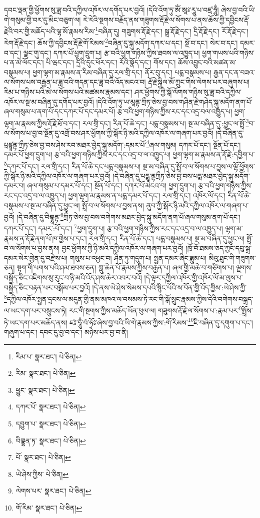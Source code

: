 དབང་ལྡན་གྱི་ཕྱོགས་སུ་ཟླ་བའི་དཀྱིལ་འཁོར་ལ་དགོད་པར་བྱའོ། །དེའི་འོག་ཏུ་ཨོཾ་ཨཱཿ་རཱུ་པ་བཛྲ་ཧཱུྃ། ཞེས་བྱ་བའི་ཡི་གེ་གསུམ་གྱི་བར་དུ་མིང་བཅུག་ལ། རེ་རེའི་སྔགས་བརྗོད་ནས་གཟུགས་རྡོ་རྗེ་ལ་སོགས་པ་ནས་ཆོས་ཀྱི་དབྱིངས་རྡོ་རྗེའི་བར་གྱི་མཆོད་པའི་ལྷ་མོ་རྣམས་རིམ་\footnote{རིམ་པ་  སྣར་ཐང་།  པེ་ཅིན། }བཞིན་དུ། གཟུགས་རྡོ་རྗེ་དང་། སྒྲ་རྡོ་རྗེ་དང་། དྲི་རྡོ་རྗེ་དང་། རོ་རྡོ་རྗེ་དང་། རེག་རྡོ་རྗེ་དང་། ཆོས་ཀྱི་དབྱིངས་རྡོ་རྗེ་གོ་རིམས་\footnote{རིམ་  སྣར་ཐང་།  པེ་ཅིན། }བཞིན་དུ་སྐུ་མདོག་དཀར་པ་དང་། སྔོ་བ་དང་། སེར་བ་དང་། དམར་བ་དང་། ལྗང་གུ་དང་། དཀར་པོ་ཕྱག་དྲུག་པ། རྩ་བའི་ཕྱག་གཉིས་ཀྱིས་ཐབས་ལ་འཁྱུད་པ། ཕྱག་གཡས་པའི་གཉིས་པ་ན་མེ་ལོང་དང་། པི་ཝང་དང་། དྲིའི་དུང་ཕོར་དང་། རོའི་སྣོད་དང་། གོས་དང་། ཆོས་འབྱུང་བའི་མཚན་མ་བསྣམས་པ། ཕྱག་ལྷག་མ་རྣམས་ན་རིམ་བཞིན་དུ་རལ་གྲི་དང་། ནོར་བུ་དང་། པདྨ་བསྣམས་པ། རྒྱན་དང་ན་བཟའ་ལ་སོགས་པས་བརྒྱན་པ་ཟླ་བའི་གདན་དང་ཟླ་བའི་འོད་མངའ་བ། རྡོ་རྗེ་སྐྱིལ་མོ་ཀྲུང་གིས་ལེགས་པར་བཞུགས་པ། རིམ་པ་གཉིས་པའི་མེ་ལ་སོགས་པའི་མཚམས་རྣམས་དང་། ཤར་ཕྱོགས་ཀྱི་སྒོ་ལོགས་གཉིས་སུ་ཟླ་བའི་དཀྱིལ་འཁོར་ལ་སྔ་མ་བཞིན་དུ་དགོད་པར་བྱའོ། །དེའི་འོག་ཏུ་ཡ་མཱནྟ་ཀྲྀཏ་ཅེས་བྱ་བས་གཤིན་རྗེ་གཤེད་སྐུ་མདོག་ནག་པོ་ཞལ་གསུམ་པ་ནག་པོ་དང་དཀར་པོ་དང་དམར་པོ། རྩ་བའི་ཕྱག་གཉིས་ཀྱིས་རང་དང་འདྲ་བལ་འཁྱུད་པ། ཕྱག་ལྷག་མ་རྣམས་ཀྱིས་རྡོ་རྗེ་ཐོ་བ་དང་། རལ་གྲི་དང་། རིན་པོ་ཆེ་དང་། པདྨ་བསྣམས་པ། སྔ་མ་བཞིན་དུ་:ཕྱུང་ལ་སྤྲོ་\footnote{ཕྱུང་  སྣར་ཐང་།  པེ་ཅིན། }བ་ལ་སོགས་པ་བྱ་བ་སྔོན་དུ་འགྲོ་བས་ཤར་ཕྱོགས་ཀྱི་སྒོར་ཉི་མའི་དཀྱིལ་འཁོར་ལ་གཞག་པར་བྱའོ། །དེ་བཞིན་དུ་པྲཛྙཱནྟ་ཀྲྀཏ་ཅེས་བྱ་བས་ཤེས་རབ་མཐར་བྱེད་སྐུ་མདོག་:དམར་པོ་\footnote{དཀར་པོ་  སྣར་ཐང་།  པེ་ཅིན། }ཞལ་གསུམ། དཀར་པོ་དང་། སྔོན་པོ་དང་། དམར་པོ་ཕྱག་དྲུག་པ། རྩ་བའི་ཕྱག་གཉིས་ཀྱིས་རང་དང་འདྲ་བ་ལ་འཁྱུད་པ། ཕྱག་ལྷག་མ་རྣམས་ན་རྡོ་རྗེ་:དབྱིག་པ་\footnote{དབྱུག་པ་  སྣར་ཐང་།  པེ་ཅིན། }དཀར་པོ་དང་། རལ་གྲི་དང་། རིན་པོ་ཆེ་དང་པདྨ་བསྣམས་པ། སྔ་མ་བཞིན་དུ་སྤྲོ་བ་ལ་སོགས་པ་བྱས་ལ་ལྷོ་ཕྱོགས་ཀྱི་སྒོར་ཉི་མའི་དཀྱིལ་འཁོར་ལ་གཞག་པར་བྱའོ། །དེ་བཞིན་དུ་པདྨཱ་ནྟཀྲྀཏ་ཅེས་བྱ་བས་པདྨ་མཐར་བྱེད་སྐུ་མདོག་དམར་བ། ཞལ་གསུམ་པ་དམར་པོ་དང་། སྔོན་པོ་དང་། དཀར་པོ་མངའ་བ། ཕྱག་དྲུག་པ། རྩ་བའི་ཕྱག་གཉིས་ཀྱིས་རང་དང་འདྲ་བ་ལ་འཁྱུད་པ། ཕྱག་ལྷག་མ་རྣམས་ན་པདྨ་དམར་པོ་དང་། རལ་གྲི་དང་། འཁོར་ལོ་དང་། རིན་པོ་ཆེ་བསྣམས་པ་སྔ་མ་བཞིན་དུ་ཕྱུང་ལ། སྤྲོ་བ་ལ་སོགས་པ་བྱས་ནས། ནུབ་ཀྱི་སྒོར་ཉི་མའི་དཀྱིལ་འཁོར་ལ་གཞག་པ་བྱའོ། །དེ་བཞིན་དུ་བིགྷྣཱནྟ་\footnote{བིགྣྷན་ཏ་  སྣར་ཐང་།  པེ་ཅིན། }ཀྲྀཏ་ཅེས་བྱ་བས་བགེགས་མཐར་བྱེད་སྐུ་མདོག་ནག་པོ་ཞལ་གསུམ་ནག་པོ་དང་། དཀར་པོ་དང་། དམར་:པོ་དང་། \footnote{པོ་  སྣར་ཐང་།  པེ་ཅིན། }ཕྱག་དྲུག་པ། རྩ་བའི་ཕྱག་གཉིས་ཀྱིས་རང་དང་འདྲ་བ་ལ་འཁྱུད་པ། ལྷག་མ་རྣམས་ན་རྡོ་རྗེ་ནག་པོ་ཁ་གྱེས་པ་དང་། རལ་གྲི་དང་། རིན་པོ་ཆེ་དང་། པདྨ་བསྣམས་པ། སྔ་མ་བཞིན་དུ་ཕྱུང་ལ། སྤྲོ་བ་ལ་སོགས་པ་བྱས་ནས། བྱང་ཕྱོགས་ཀྱི་ཉི་མའི་དཀྱིལ་འཁོར་ལ་གཞག་པར་བྱའོ། །ཁྲོ་བོ་ཐམས་ཅད་ཀྱང་དབུ་སྐྲ་དམར་སེར་གྱེན་དུ་བརྫེས་པ། གསུས་པ་འཕྱང་བ། ཤིན་ཏུ་གདུག་པ། སྤྱན་དམར་ཞིང་ཟླུམ་པ། མིའུ་ཐུང་གི་གཟུགས་ཅན། སྟག་གི་པགས་པའི་ཤམ་ཐབས་ཅན། ཀླུ་ཆེན་པོ་རྣམས་ཀྱིས་བརྒྱན་པ། ཞལ་གྱི་མཆེ་བ་གཙིགས་པ། ལྗགས་བསྐྱོད་ཅིང་འཇིགས་སུ་རུང་བ་ཉི་མའི་འོད་ཤས་ཆེར་འབར་བའོ། །དེ་ལྟར་དཀྱིལ་འཁོར་གྱི་འཁོར་ལོ་མ་ལུས་པ་བསྐྱེད་ཅིང་བརྟན་པར་བསྒོམ་པར་བྱའོ། །དེ་ནས་ཡེ་ཤེས་སེམས་དཔའི་སྙིང་པོའི་ས་བོན་གྱི་འོད་ཀྱིས་:ཡེ་ཤེས་ཀྱི་\footnote{ཡེ་ཤེས་ཀྱིས་  པེ་ཅིན། }དཀྱིལ་འཁོར་སྤྱན་དྲངས་ལ་མདུན་གྱི་ནམ་མཁའ་ལ་བསམས་ཏེ་རང་གི་སྒོ་སྲུང་རྣམས་ཀྱིས་དེའི་བགེགས་བསྐྲད་ལ་ཡང་དག་པར་བསྲུངས་ཏེ། རང་གི་སྔགས་ཀྱིས་མཆོད་ཡོན་ཕུལ་ལ། གཟུགས་རྡོ་རྗེ་ལ་སོགས་པ་:རྣམ་པར་\footnote{ལེགས་པར་  སྣར་ཐང་།  པེ་ཅིན། }སྤྲོས་ཏེ་ཡང་དག་པར་མཆོད་ནས། ཛཿ་ཧཱུྃ་བཾ་ཧོཿ་ཞེས་བྱ་བའི་ཡི་གེ་རྣམས་ཀྱིས་:གོ་རིམས་\footnote{གོ་རིམ་  སྣར་ཐང་།  པེ་ཅིན། }ཇི་བཞིན་དུ་དགུག་པ་དང་། གཞུག་པ་དང་། དབང་དུ་བྱ་བ་དང་། མཉེས་པར་བྱ་བ་ནི། 